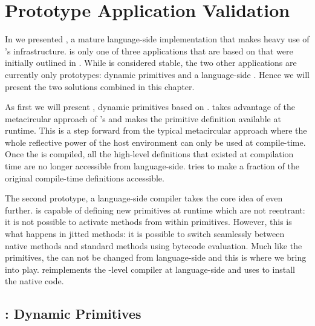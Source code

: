 

\chapter{\B Prototype Application Validation}
\minitoc
\introduction

In  we presented \NB, a mature language-side \FFI implementation that makes heavy use of \B's infrastructure.
\NB is only one of three applications that are based on \B that were initially outlined in .
While \NB is considered stable, the two other applications are currently only prototypes: dynamic primitives and a language-side \JIT.
Hence we will present the two solutions combined in this chapter.

As first we will present \WF, dynamic primitives based on \B.
\WF takes advantage of the metacircular approach of \PH's \VM and makes the primitive definition available at runtime.
This is a step forward from the typical metacircular approach where the whole reflective power of the host environment can only be used at compile-time.
Once the \VM is compiled, all the high-level definitions that existed at compilation time are no longer accessible from language-side.
\WF tries to make a fraction of the original compile-time definitions accessible.

\enlargethispage{\baselineskip}
The second prototype, \NB a language-side \JIT compiler takes the core idea of \WF even further.
\WF is capable of defining new primitives at runtime which are not reentrant: it is not possible to activate \PH methods from within primitives.
However, this is what happens in jitted methods: it is possible to switch seamlessly between native methods and standard \PH methods using bytecode evaluation.
Much like the primitives, the \JIT can not be changed from language-side and this is where we bring \NBJ into play.
\NBJ reimplements the \VM-level \JIT compiler at language-side and uses \B to install the native code.


\section{\WF: Dynamic Primitives}

